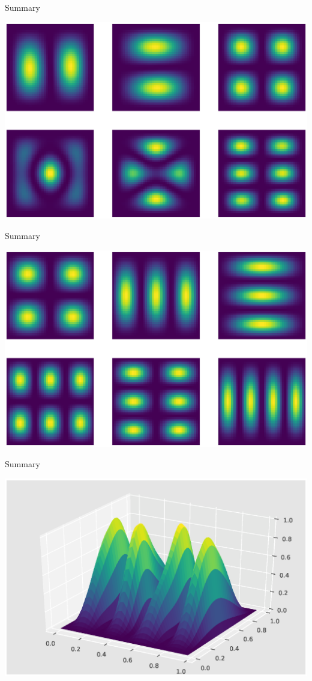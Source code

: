 \documentclass[mathserif]{beamer}
\begin{document}
\begin{frame}{Summary}

\center \includegraphics[scale=0.45]{what1.eps}

\end{frame}

\begin{frame}{Summary}

\center \includegraphics[scale=0.45]{correct3.eps}

\end{frame}

\begin{frame}{Summary}

\center \includegraphics[scale=0.45]{psi8.eps}

\end{frame}
\end{document}
